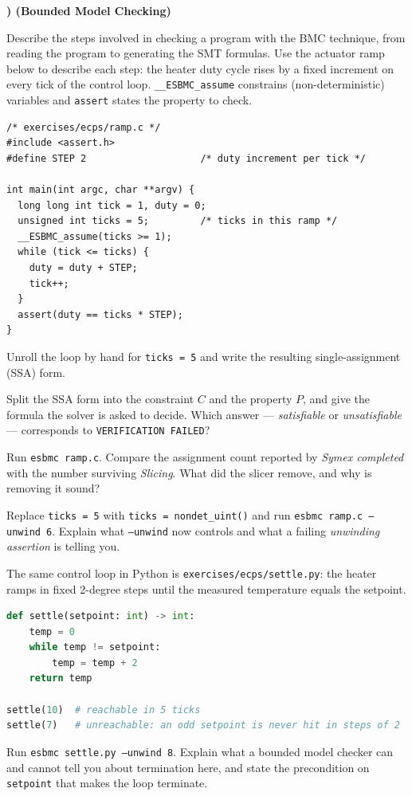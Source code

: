 \documentclass[11pt,a4paper]{article}
\newcommand{\flag}[1]{\texttt{\small #1}}
\newcommand{\file}[1]{\texttt{\small #1}}
\newcounter{exc}
\newenvironment{exercise}[1]
  {\stepcounter{exc}\medskip\noindent\textbf{\theexc) (#1)}\par\nopagebreak\smallskip}
  {\par\medskip}
\begin{document}
\begin{exercise}{Bounded Model Checking}
Describe the steps involved in checking a program with the BMC technique, from
reading the program to generating the SMT formulas. Use the actuator ramp below
to describe each step: the heater duty cycle rises by a fixed increment on every
tick of the control loop. \texttt{\_\_ESBMC\_assume} constrains
(non-deterministic) variables and \texttt{assert} states the property to check.

\begin{lstlisting}
/* exercises/ecps/ramp.c */
#include <assert.h>
#define STEP 2                    /* duty increment per tick */

int main(int argc, char **argv) {
  long long int tick = 1, duty = 0;
  unsigned int ticks = 5;         /* ticks in this ramp */
  __ESBMC_assume(ticks >= 1);
  while (tick <= ticks) {
    duty = duty + STEP;
    tick++;
  }
  assert(duty == ticks * STEP);
}
\end{lstlisting}

\begin{parts}
  \item Unroll the loop by hand for \texttt{ticks = 5} and write the resulting
        single-assignment (SSA) form.
  \item Split the SSA form into the constraint $C$ and the property $P$, and
        give the formula the solver is asked to decide. Which answer ---
        \emph{satisfiable} or \emph{unsatisfiable} --- corresponds to
        \texttt{VERIFICATION FAILED}?
  \item Run \texttt{esbmc ramp.c}. Compare the assignment count reported by
        \emph{Symex completed} with the number surviving \emph{Slicing}. What
        did the slicer remove, and why is removing it sound?
  \item Replace \texttt{ticks = 5} with \texttt{ticks = nondet\_uint()} and run
        \texttt{esbmc ramp.c --unwind 6}. Explain what \flag{--unwind} now
        controls and what a failing \emph{unwinding assertion} is telling you.
  \item The same control loop in Python is
        \file{exercises/ecps/settle.py}: the heater ramps in fixed 2-degree
        steps until the measured temperature equals the setpoint.

\begin{lstlisting}[language=Python]
def settle(setpoint: int) -> int:
    temp = 0
    while temp != setpoint:
        temp = temp + 2
    return temp

settle(10)  # reachable in 5 ticks
settle(7)   # unreachable: an odd setpoint is never hit in steps of 2
\end{lstlisting}

        Run \texttt{esbmc settle.py --unwind 8}. Explain what a bounded model
        checker can and cannot tell you about termination here, and state the
        precondition on \texttt{setpoint} that makes the loop terminate.
\end{parts}
\end{exercise}
\end{document}
